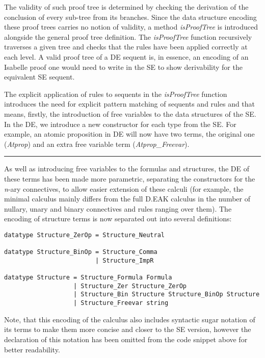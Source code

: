 The validity of such proof tree is determined by checking the derivation
of the conclusion of every sub-tree from its branches. Since the data
structure encoding these proof trees carries no notion of validity, a
method \emph{isProofTree} is introduced alongside the general proof tree
definition. The \emph{isProofTree} function recursively traverses a
given tree and checks that the rules have been applied correctly at each
level. A valid proof tree of a DE sequent is, in essence, an encoding of
an Isabelle proof one would need to write in the SE to show derivability
for the equivalent SE sequent.

The explicit application of rules to sequents in the \emph{isProofTree}
function introduces the need for explicit pattern matching of sequents
and rules and that means, firstly, the introduction of free variables to
the data structures of the SE.\\ In the DE, we introduce a new
constructor for each type from the SE. For example, an atomic
proposition in DE will now have two terms, the original one
(\emph{Atprop}) and an extra free variable term
(\emph{Atprop\_Freevar}).

\begin{center}\rule{3in}{0.4pt}\end{center}

As well as introducing free variables to the formulas and structures,
the DE of these terms has been made more parametric, separating the
constructors for the \emph{n}-ary connectives, to allow easier extension
of these calculi (for example, the minimal calculus mainly differs from
the full D.EAK calculus in the number of nullary, unary and binary
connectives and rules ranging over them). The encoding of structure
terms is now separated out into several definitions:

\begin{verbatim}
datatype Structure_ZerOp = Structure_Neutral
 
datatype Structure_BinOp = Structure_Comma
                         | Structure_ImpR

datatype Structure = Structure_Formula Formula
                   | Structure_Zer Structure_ZerOp
                   | Structure_Bin Structure Structure_BinOp Structure
                   | Structure_Freevar string
\end{verbatim}

Note, that this encoding of the calculus also includes syntactic sugar
notation of its terms to make them more concise and closer to the SE
version, however the declaration of this notation has been omitted from
the code snippet above for better readability.

